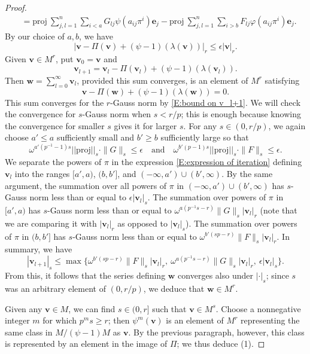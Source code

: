 \documentclass[12pt]{article}
\theoremstyle{definition}
\numberwithin{equation}{theorem}
\newcommand{\bbe}{\mathbf{e}}
\newcommand{\bbv}{\mathbf{v}}
\newcommand{\bbw}{\mathbf{w}}
\begin{document}
\begin{proof}
\begin{align}
\label{E:expression of iteration}
&=\mathrm{proj} \  
\sum_{j, l=1}^n
\sum_{i<a}
G_{lj}\psi(a_{ij}\pi^i) \bbe_j
 - \mathrm{proj}\
\sum_{j,l=1}^n
\sum_{i>b}
F_{lj} \varphi(a_{ij} \pi^i)\bbe_j.
\end{align}
By our choice of $a,b$, we have
\[
|\bbv - \Pi(\bbv) + (\psi-1)(\lambda(\bbv))|_r  \leq \epsilon |\bbv|_r.
\]
Given $\bbv \in M^r$, put $\bbv_0 = \bbv$ and 
\begin{equation}
\label{E:bound on v_l+1}
\bbv_{l+1} = \bbv_l - \Pi(\bbv_l) + (\psi-1)(\lambda(\bbv_l)).
\end{equation}
Then $\bbw = \sum_{l=0}^\infty \bbv_l$, provided this sum converges, is an element
of $M^r$ satisfying
\[
\bbv-\Pi(\bbw)+(\psi-1)(\lambda(\bbw)) = 0.
\]
This sum converges for the $r$-Gauss norm by \eqref{E:bound on v_l+1}.
We will check the convergence for $s$-Gauss norm when $ s < r/p$; this is enough because knowing the convergence for smaller $s$ gives it for larger $s$.
For any $s \in (0,r/p)$, we again choose $a'\leq a$ sufficiently small and $b'\geq b$ sufficiently large so that 
\[
\omega^{a'(p^{-1}-1)s}||\mathrm{proj}||_s\cdot  \|G\|_{s} \leq \epsilon \quad \textrm{and} \quad \omega^{b'(p-1)s}||\mathrm{proj}||_s\cdot  \|F\|_{s} \leq \epsilon.
\]
We separate the
powers of $\pi$ in the expression \eqref{E:expression of iteration} defining $\bbv_l$ into the ranges $[a', a)$, $(b,b']$, and $(-\infty, a') \cup (b', \infty)$.  By the same argument, the summation over all powers of $\pi$ in   $(-\infty, a') \cup (b', \infty)$ has $s$-Gauss norm less than or equal to $\epsilon |\bbv_l|_s$.  The summation over powers of $\pi$ in $[a', a)$ has $s$-Gauss norm less than or equal to $ \omega^{a(p^{-1}s-r)}\|G\|_s |\bbv_l|_r$ (note that we are comparing it with $|\bbv_l|_r$ as opposed to $|\bbv_l|_s$).  The summation over powers of $\pi$ in $(b, b']$ has $s$-Gauss norm less than or equal to $ \omega^{b'(sp-r)}\|F\|_s|\bbv_l|_r$.  In summary, we have
\[
|\bbv_{l+1}|_s \leq \max\{ \omega^{b'(sp-r)}\|F\|_s|\bbv_l|_r,\ \omega^{a(p^{-1}s-r)}\|G\|_s |\bbv_l|_r,\ \epsilon |\bbv_l|_s\}.
\]
From this, it follows that the series defining $\bbw$ converges also under $|\cdot|_s$; since $s$ was an arbitrary
element of $(0,r/p)$, we deduce that $\bbw \in M^r$.

Given any $\bbv \in M$, we can find $s \in (0,r]$ such that $\bbv \in M^s$.
Choose a nonnegative integer $m$ for which $p^m s \geq r$; then $\psi^m(\bbv)$ is an element of $M^r$
representing the same class in $M/(\psi-1)M$ as $\bbv$. By the previous paragraph, however, this class is represented
by an element in the image of $\Pi$; we thus deduce (1).


\end{proof}
\end{document}
